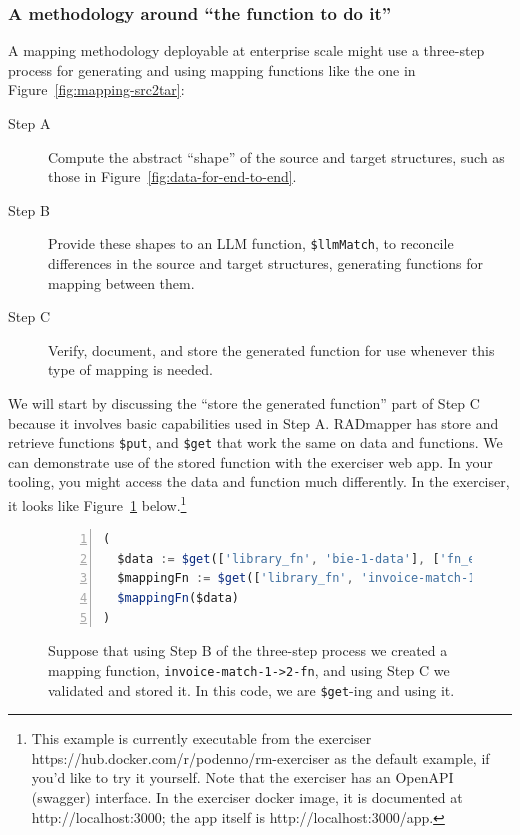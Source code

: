 \documentclass[10pt,letterpaper]{article} %
\newcommand{\stt}[1]{\texttt{#1}} %
\begin{document}
\subsubsection{A methodology around ``the function to do it''}
\label{methodology-of-fn}
A mapping methodology deployable at enterprise scale might use a three-step process for generating and using
mapping functions like the one in Figure~\ref{fig:mapping-src2tar}:
\begin{description}
  \item[Step A] Compute the abstract ``shape'' of the source and target structures, such as those in Figure~\ref{fig:data-for-end-to-end}.
  \item[Step B] Provide these shapes to an LLM function, \stt{\$llmMatch}, to reconcile differences in the source and target structures, generating functions for mapping between them.
\item[Step C] Verify, document, and store the generated function for use whenever this type of mapping is needed.
\end{description}

We will start by discussing the ``store the generated function'' part of Step C because it involves basic capabilities used in Step A.
RADmapper has store and retrieve functions \stt{\$put}, and \stt{\$get} that work the same on data and functions.
We can demonstrate use of the stored function with the exerciser web app.
In your tooling, you might access the data and function much differently.
In the exerciser, it looks like Figure~\ref{fig:run-a-map-fn} below.\footnote{This example is currently executable from the exerciser https://hub.docker.com/r/podenno/rm-exerciser as the default example, if you'd like to try it yourself.
  Note that the exerciser has an OpenAPI (swagger) interface.
  In the exerciser docker image, it is documented at http://localhost:3000; the app itself is http://localhost:3000/app.}

\begin{figure}[H]
  \caption{Suppose that using Step B of the three-step process we created a mapping function, \stt{invoice-match-1->2-fn}, and using Step C we validated and stored it.
    In this code, we are \stt{\$get}-ing and using it.}
  \label{fig:run-a-map-fn}
\begin{lstlisting}[language=JavaScript,numberstyle=\scriptsize,basicstyle=\ttfamily\scriptsize,numbers=left,stepnumber=1,breaklines=true]
(
  $data := $get(['library_fn', 'bie-1-data'], ['fn_exe']).fn_exe;
  $mappingFn := $get(['library_fn', 'invoice-match-1->2-fn'], ['fn_exe']).fn_exe;
  $mappingFn($data)
)
\end{lstlisting}
\end{figure} \vspace{-3em}
\end{document}
